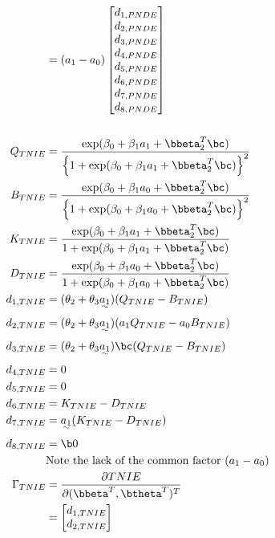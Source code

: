 \documentclass[dvipdfmx,10pt]{article}
\begin{document}
\begin{align*}
  &= (a_{1}-a_{0})
    \begin{bmatrix}
      d_{1,PNDE}\\
      d_{2,PNDE}\\
      d_{3,PNDE}\\
      d_{4,PNDE}\\
      d_{5,PNDE}\\
      d_{6,PNDE}\\
      d_{7,PNDE}\\
      d_{8,PNDE}\\
    \end{bmatrix}\\
  \\
  Q_{TNIE} &= \frac
      {            \exp(\beta_{0} + \beta_{1}a_{1} + \bbeta_{2}^{T}\bc)}
      {\left\{ 1 + \exp(\beta_{0} + \beta_{1}a_{1} + \bbeta_{2}^{T}\bc) \right\}^{2}}\\
  B_{TNIE} &= \frac
      {            \exp(\beta_{0} + \beta_{1}a_{0} + \bbeta_{2}^{T}\bc)}
      {\left\{ 1 + \exp(\beta_{0} + \beta_{1}a_{0} + \bbeta_{2}^{T}\bc) \right\}^{2}}\\
  K_{TNIE} &= \frac
      {    \exp(\beta_{0} + \beta_{1}a_{1} + \bbeta_{2}^{T}\bc)}
      {1 + \exp(\beta_{0} + \beta_{1}a_{1} + \bbeta_{2}^{T}\bc)}\\
  D_{TNIE} &= \frac
      {    \exp(\beta_{0} + \beta_{1}a_{0} + \bbeta_{2}^{T}\bc)}
      {1 + \exp(\beta_{0} + \beta_{1}a_{0} + \bbeta_{2}^{T}\bc)}\\
  d_{1,TNIE} &= (\theta_{2} + \theta_{3}\uwave{a_{1}}) (Q_{TNIE} - B_{TNIE})\\
  d_{2,TNIE} &= (\theta_{2} + \theta_{3}\uwave{a_{1}}) (a_{1}Q_{TNIE} - a_{0}B_{TNIE})\\
  d_{3,TNIE} &= (\theta_{2} + \theta_{3}\uwave{a_{1}})\bc (Q_{TNIE} - B_{TNIE})\\
  d_{4,TNIE} &= 0\\
  d_{5,TNIE} &= 0\\
  d_{6,TNIE} &= K_{TNIE} - D_{TNIE}\\
  d_{7,TNIE} &= \uwave{a_{1}} (K_{TNIE} - D_{TNIE})\\
  d_{8,TNIE} &= \b0\\
  &\text{Note the lack of the common factor }(a_{1} - a_{0})\\
  \Gamma_{TNIE}
  &= \frac{\partial TNIE}{\partial (\bbeta^{T},\btheta^{T})^{T}}\\
  &= \begin{bmatrix}
      d_{1,TNIE}\\
      d_{2,TNIE}\\

\end{bmatrix}
\end{align*}
\end{document}
